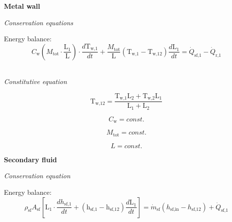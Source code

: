 \documentclass[11pt]{article} %
\begin{document}

{\bf Metal wall}\\
\begin{center}
\textit{Conservation equations}\\
\end{center}

Energy balance:\\

\begin{equation}
C_\text{w}(M_\text{tot} \cdot \frac{\text{L}_\text{1}}{\text{L}}) \cdot  \frac{d \text{T}_\text{w,1}}{d t} + \frac{M_\text{tot}}{\text{L}} (\text{T}_\text{w,1} - \text{T}_\text{w,12})  \frac{d \text{L}_\text{1}}{d t} = \dot{Q}_\text{sf,1} - \dot{Q}_\text{r,1}
\end{equation}\\

\begin{center}
\textit{Constitutive equation}\\
\end{center}
\begin{equation}
\text{T}_\text{w,12} = \frac{   \text{T}_\text{w,1} \text{L}_\text{2}  + \text{T}_\text{w,2}\text{L}_\text{1}      }{  \text{L}_\text{1} + \text{L}_\text{2}         } 
\end{equation}

\begin{equation}
C_\text{w} = const.
\end{equation}

\begin{equation}
M_\text{tot} = const.
\end{equation}

\begin{equation}
L= const.
\end{equation}

{\bf Secondary fluid}\\
\begin{center}
\textit{Conservation equation}\\
\end{center}


Energy balance:\\
\begin{equation}
\rho_\text{sf} A_\text{sf} [\text{L}_\text{1} \cdot  \frac{d h_\text{sf,1}}{d t} +  (\text{h}_\text{sf,1} - \text{h}_\text{sf,12})  \frac{d \text{L}_\text{1}}{d t}] = \dot{m}_\text{sf} ({h}_\text{sf,in} - h_\text{sf,12} ) + \dot{Q}_\text{sf,1} 
\end{equation}
\end{document}
